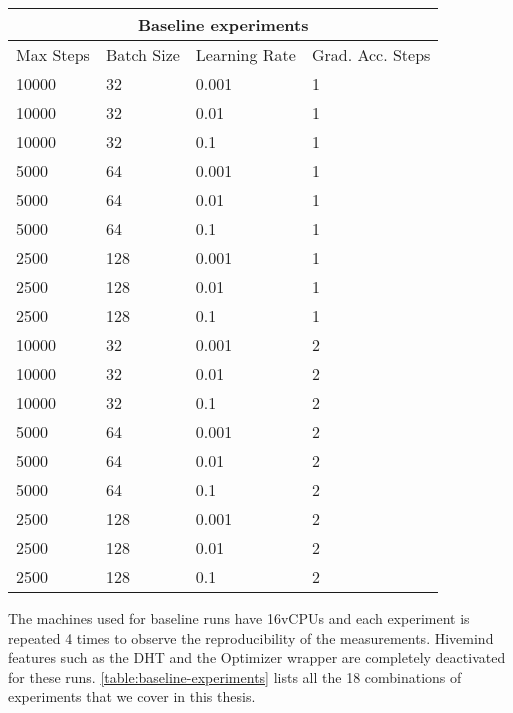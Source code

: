 \begin{tabularx}{\linewidth}{ |p{3cm}|p{3cm}|p{3cm}|p{3cm}|  }
    \caption{
        List of baseline experiments and hyperparameters
    }\label{table:baseline-experiments}                       \\
    \hline
    \multicolumn{4}{|c|}{Baseline experiments}                \\
    \hline
    Max Steps & Batch Size & Learning Rate & Grad. Acc. Steps \\
    \hline
    10000    & 32         & 0.001         & 1                \\
    10000    & 32         & 0.01          & 1                \\
    10000    & 32         & 0.1           & 1                \\
    5000      & 64         & 0.001         & 1                \\
    5000      & 64         & 0.01          & 1                \\
    5000      & 64         & 0.1           & 1                \\
    2500      & 128        & 0.001         & 1                \\
    2500      & 128        & 0.01          & 1                \\
    2500      & 128        & 0.1           & 1                \\
    \hline
    10000    & 32         & 0.001         & 2                \\
    10000    & 32         & 0.01          & 2                \\
    10000    & 32         & 0.1           & 2                \\
    5000      & 64         & 0.001         & 2                \\
    5000      & 64         & 0.01          & 2                \\
    5000      & 64         & 0.1           & 2                \\
    2500      & 128        & 0.001         & 2                \\
    2500      & 128        & 0.01          & 2                \\
    2500      & 128        & 0.1           & 2                \\
    \hline
\end{tabularx}

The machines used for baseline runs have 16vCPUs and each experiment is repeated 4 times to observe the reproducibility of the measurements.
Hivemind features such as the DHT and the Optimizer wrapper are completely deactivated for these runs.
\autoref{table:baseline-experiments} lists all the 18 combinations of experiments that we cover in this thesis.

